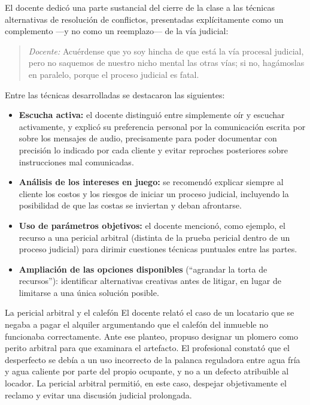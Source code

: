\documentclass[12pt,oneside]{book}
\begin{document}
El docente dedicó una parte sustancial del cierre de la clase a las técnicas alternativas de resolución de conflictos, presentadas explícitamente como un complemento —y no como un reemplazo— de la vía judicial:

\begin{quote}
\textit{Docente:} Acuérdense que yo soy hincha de que está la vía procesal judicial, pero no saquemos de nuestro nicho mental las otras vías; si no, hagámoslas en paralelo, porque el proceso judicial es fatal.
\end{quote}

Entre las técnicas desarrolladas se destacaron las siguientes:

\begin{itemize}
\item \textbf{Escucha activa:} el docente distinguió entre simplemente oír y escuchar activamente, y explicó su preferencia personal por la comunicación escrita por sobre los mensajes de audio, precisamente para poder documentar con precisión lo indicado por cada cliente y evitar reproches posteriores sobre instrucciones mal comunicadas.
\item \textbf{Análisis de los intereses en juego:} se recomendó explicar siempre al cliente los costos y los riesgos de iniciar un proceso judicial, incluyendo la posibilidad de que las costas se inviertan y deban afrontarse.
\item \textbf{Uso de parámetros objetivos:} el docente mencionó, como ejemplo, el recurso a una pericial arbitral (distinta de la prueba pericial dentro de un proceso judicial) para dirimir cuestiones técnicas puntuales entre las partes.
\item \textbf{Ampliación de las opciones disponibles} (``agrandar la torta de recursos''): identificar alternativas creativas antes de litigar, en lugar de limitarse a una única solución posible.
\end{itemize}

\begin{example}{La pericial arbitral y el calefón}
El docente relató el caso de un locatario que se negaba a pagar el alquiler argumentando que el calefón del inmueble no funcionaba correctamente. Ante ese planteo, propuso designar un plomero como perito arbitral para que examinara el artefacto. El profesional constató que el desperfecto se debía a un uso incorrecto de la palanca reguladora entre agua fría y agua caliente por parte del propio ocupante, y no a un defecto atribuible al locador. La pericial arbitral permitió, en este caso, despejar objetivamente el reclamo y evitar una discusión judicial prolongada.
\end{example}
\end{document}
